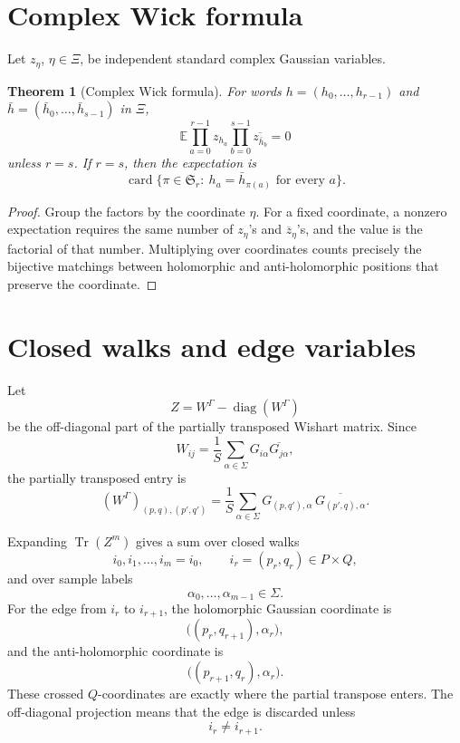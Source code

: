 \documentclass[11pt,oneside]{book}
\newtheorem{theorem}{Theorem}[chapter]
\DeclareMathOperator{\Tr}{Tr}
\DeclareMathOperator{\diag}{diag}
\DeclareMathOperator{\card}{card}
\newcommand{\E}{\mathbb E}
\newcommand{\1}{\mathbf 1}
\newcommand{\GammaPT}{\Gamma}
\begin{document}
\section{Complex Wick formula}

Let \(z_\eta\), \(\eta\in\Xi\), be independent standard complex Gaussian
variables.

\begin{theorem}[Complex Wick formula]
For words \(h=(h_0,\ldots,h_{r-1})\) and
\(\bar h=(\bar h_0,\ldots,\bar h_{s-1})\) in \(\Xi\),
\[
  \E\prod_{a=0}^{r-1}z_{h_a}
    \prod_{b=0}^{s-1}\overline{z_{\bar h_b}}
  =
  0
\]
unless \(r=s\).  If \(r=s\), then the expectation is
\[
  \card\{\pi\in\mathfrak S_r:\ h_a=\bar h_{\pi(a)}
       \text{ for every }a\}.
\]
\end{theorem}

\begin{proof}
Group the factors by the coordinate \(\eta\).  For a fixed coordinate, a
nonzero expectation requires the same number of \(z_\eta\)'s and
\(\overline z_\eta\)'s, and the value is the factorial of that number.
Multiplying over coordinates counts precisely the bijective matchings between
holomorphic and anti-holomorphic positions that preserve the coordinate.
\end{proof}

\section{Closed walks and edge variables}

Let
\[
  Z=W^{\GammaPT}-\diag(W^{\GammaPT})
\]
be the off-diagonal part of the partially transposed Wishart matrix.  Since
\[
  W_{ij}=\frac1S\sum_{\alpha\in\Sigma}G_{i\alpha}\overline{G_{j\alpha}},
\]
the partially transposed entry is
\[
  (W^{\GammaPT})_{(p,q),(p',q')}
  =
  \frac1S\sum_{\alpha\in\Sigma}
  G_{(p,q'),\alpha}\,
  \overline{G_{(p',q),\alpha}}.
\]

Expanding \(\Tr(Z^m)\) gives a sum over closed walks
\[
  i_0,i_1,\ldots,i_m=i_0,
  \qquad
  i_r=(p_r,q_r)\in P\times Q,
\]
and over sample labels
\[
  \alpha_0,\ldots,\alpha_{m-1}\in\Sigma.
\]
For the edge from \(i_r\) to \(i_{r+1}\), the holomorphic Gaussian coordinate
is
\[
  \bigl((p_r,q_{r+1}),\alpha_r\bigr),
\]
and the anti-holomorphic coordinate is
\[
  \bigl((p_{r+1},q_r),\alpha_r\bigr).
\]
These crossed \(Q\)-coordinates are exactly where the partial transpose enters.
The off-diagonal projection means that the edge is discarded unless
\[
  i_r\ne i_{r+1}.
\]
\end{document}
